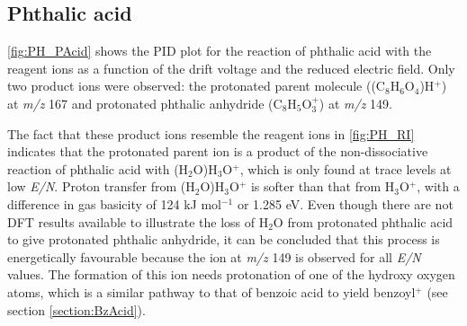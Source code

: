 \subsection{Phthalic acid}

\autoref{fig:PH_PAcid} shows the PID plot for the reaction of phthalic acid with the reagent ions as a function of the drift voltage and the reduced electric field. 
%
Only two product ions were observed: the protonated parent molecule  ((C$_8$H$_6$O$_4$)H$^+$)  at \textit{m/z} 167 and  protonated phthalic anhydride (C$_8$H$_{5}$O$_3^+$) at \textit{m/z} 149.

The fact that these product ions resemble the reagent ions in \autoref{fig:PH_RI} indicates that the protonated parent ion is a product of the non-dissociative reaction of phthalic acid with (H$_2$O)H$_3$O$^+$, which is only found at trace levels at low \textit{E/N}.
%
Proton transfer from (H$_2$O)H$_3$O$^+$ is  softer  than that from H$_3$O$^+$, with a difference in gas basicity  of 124 kJ mol$^{-1}$ or 1.285 eV.
%
Even though there are not DFT results available to illustrate the loss of H$_2$O from protonated phthalic acid to give protonated phthalic anhydride, it can be concluded that this process is energetically favourable because the ion at \textit{m/z} 149 is observed for all \textit{E/N} values. 
%
The formation of this ion needs  protonation of one of the hydroxy oxygen atoms, which is a similar pathway to that of benzoic acid to yield benzoyl$^+$ (see section \ref{section:BzAcid}). %














